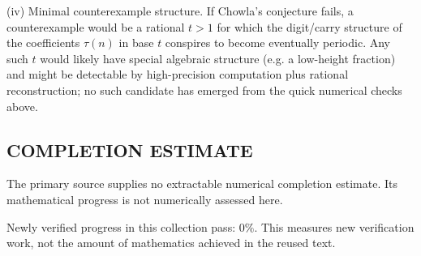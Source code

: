 (iv) Minimal counterexample structure.
If Chowla's conjecture fails, a counterexample would be a rational $t>1$ for which the digit/carry
structure of the coefficients $\tau(n)$ in base $t$ conspires to become eventually periodic.
Any such $t$ would likely have special algebraic structure (e.g. a low-height fraction) and might be
detectable by high-precision computation plus rational reconstruction; no such candidate has emerged
from the quick numerical checks above.




\subsection*{COMPLETION ESTIMATE}
The primary source supplies no extractable numerical completion estimate. Its mathematical progress is not numerically assessed here.

Newly verified progress in this collection pass: $0\%$. This measures new verification work, not the amount of mathematics achieved in the reused text.
